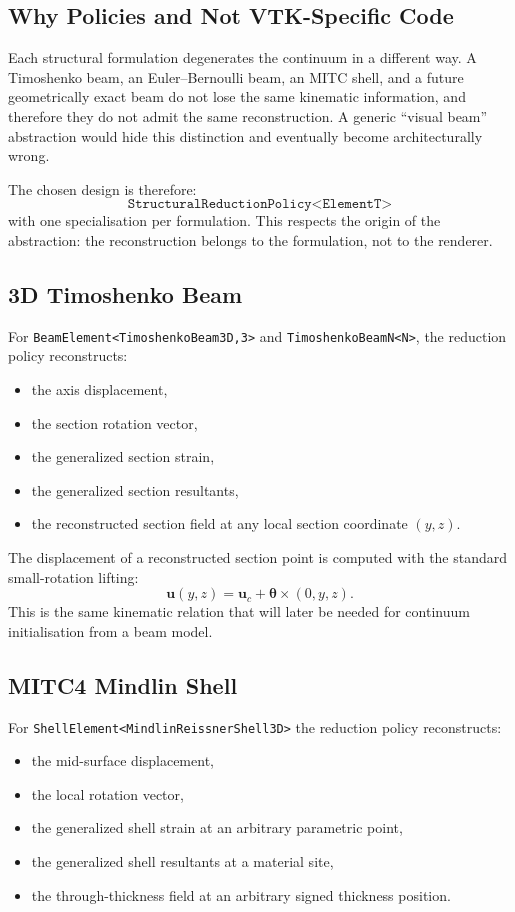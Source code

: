 \subsection{Why Policies and Not VTK-Specific Code}

Each structural formulation degenerates the continuum in a different way.  A
Timoshenko beam, an Euler--Bernoulli beam, an MITC shell, and a future
geometrically exact beam do not lose the same kinematic information, and
therefore they do not admit the same reconstruction.  A generic ``visual
beam'' abstraction would hide this distinction and eventually become
architecturally wrong.

The chosen design is therefore:
\[
\texttt{StructuralReductionPolicy<ElementT>}
\]
with one specialisation per formulation.  This respects the origin of the
abstraction: the reconstruction belongs to the formulation, not to the
renderer.

\subsection{3D Timoshenko Beam}

For \texttt{BeamElement<TimoshenkoBeam3D,3>} and \texttt{TimoshenkoBeamN<N>},
the reduction policy reconstructs:
\begin{itemize}
  \item the axis displacement,
  \item the section rotation vector,
  \item the generalized section strain,
  \item the generalized section resultants,
  \item the reconstructed section field at any local section coordinate
        $(y,z)$.
\end{itemize}

The displacement of a reconstructed section point is computed with the standard
small-rotation lifting:
\[
\mathbf{u}(y,z) = \mathbf{u}_c + \boldsymbol{\theta}\times(0,y,z).
\]
This is the same kinematic relation that will later be needed for continuum
initialisation from a beam model.

\subsection{MITC4 Mindlin Shell}

For \texttt{ShellElement<MindlinReissnerShell3D>} the reduction policy
reconstructs:
\begin{itemize}
  \item the mid-surface displacement,
  \item the local rotation vector,
  \item the generalized shell strain at an arbitrary parametric point,
  \item the generalized shell resultants at a material site,
  \item the through-thickness field at an arbitrary signed thickness position.
\end{itemize}

